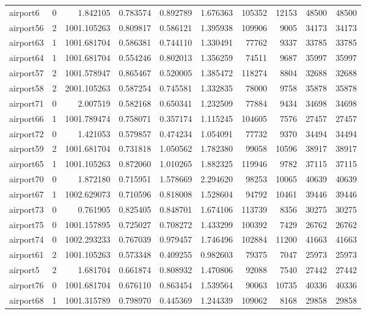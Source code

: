 \begin{longtable}{|l|r|r|r|r|r|r|r|r|r|}
airport6 & 0 & 1.842105 & 0.783574 & 0.892789 & 1.676363 & 105352 & 12153 & 48500 & 48500 \\
airport56 & 2 & 1001.105263 & 0.809817 & 0.586121 & 1.395938 & 109906 & 9005 & 34173 & 34173 \\
airport63 & 1 & 1001.681704 & 0.586381 & 0.744110 & 1.330491 & 77762 & 9337 & 33785 & 33785 \\
airport64 & 1 & 1001.681704 & 0.554246 & 0.802013 & 1.356259 & 74511 & 9687 & 35997 & 35997 \\
airport57 & 2 & 1001.578947 & 0.865467 & 0.520005 & 1.385472 & 118274 & 8804 & 32688 & 32688 \\
airport58 & 2 & 2001.105263 & 0.587254 & 0.745581 & 1.332835 & 78000 & 9758 & 35878 & 35878 \\
airport71 & 0 & 2.007519 & 0.582168 & 0.650341 & 1.232509 & 77884 & 9434 & 34698 & 34698 \\
airport66 & 1 & 1001.789474 & 0.758071 & 0.357174 & 1.115245 & 104605 & 7576 & 27457 & 27457 \\
airport72 & 0 & 1.421053 & 0.579857 & 0.474234 & 1.054091 & 77732 & 9370 & 34494 & 34494 \\
airport59 & 2 & 1001.681704 & 0.731818 & 1.050562 & 1.782380 & 99058 & 10596 & 38917 & 38917 \\
airport65 & 1 & 1001.105263 & 0.872060 & 1.010265 & 1.882325 & 119946 & 9782 & 37115 & 37115 \\
airport70 & 0 & 1.872180 & 0.715951 & 1.578669 & 2.294620 & 98253 & 10065 & 40639 & 40639 \\
airport67 & 1 & 1002.629073 & 0.710596 & 0.818008 & 1.528604 & 94792 & 10461 & 39446 & 39446 \\
airport73 & 0 & 0.761905 & 0.825405 & 0.848701 & 1.674106 & 113739 & 8356 & 30275 & 30275 \\
airport75 & 0 & 1001.157895 & 0.725027 & 0.708272 & 1.433299 & 100392 & 7429 & 26762 & 26762 \\
airport74 & 0 & 1002.293233 & 0.767039 & 0.979457 & 1.746496 & 102884 & 11200 & 41663 & 41663 \\
airport61 & 2 & 1001.105263 & 0.573348 & 0.409255 & 0.982603 & 79375 & 7047 & 25973 & 25973 \\
airport5 & 2 & 1.681704 & 0.661874 & 0.808932 & 1.470806 & 92088 & 7540 & 27442 & 27442 \\
airport76 & 0 & 1001.681704 & 0.676110 & 0.863454 & 1.539564 & 90063 & 10735 & 40336 & 40336 \\
airport68 & 1 & 1001.315789 & 0.798970 & 0.445369 & 1.244339 & 109062 & 8168 & 29858 & 29858 \\

\end{longtable}
